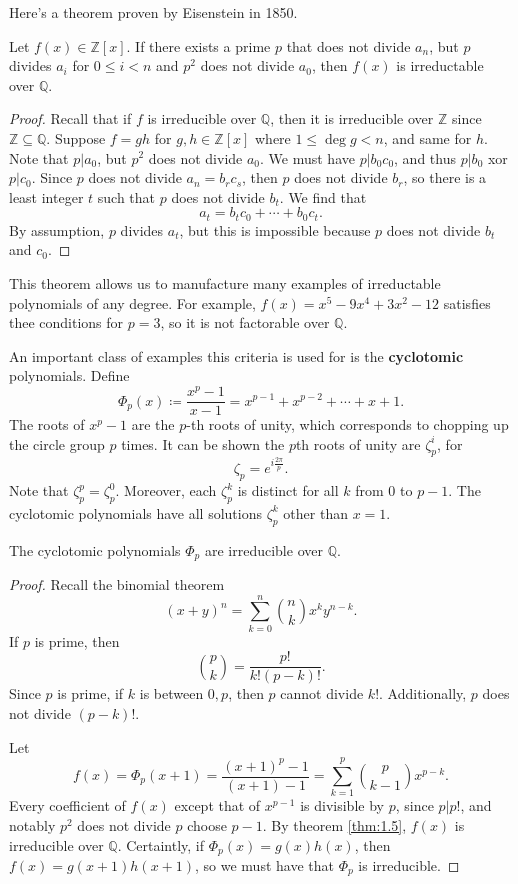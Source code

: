 Here's a theorem proven by Eisenstein in 1850.
\begin{theorem}\label{thm:1.5}
	Let $f(x)\in\mathbb{Z} [x]$. If there exists a prime $p$ that does not divide $a_n$, but $p$ divides $a_i$ for $0\leq i<n$ and $p^2$ does not divide $a_0$, then $f(x)$ is irreductable over $\mathbb{Q} $.
\end{theorem}
\begin{proof}
	Recall that if $f$ is irreducible over $\mathbb{Q} $, then it is irreducible over $\mathbb{Z} $ since $\mathbb{Z} \subseteq \mathbb{Q} $. Suppose $f=gh$ for $g,h\in \mathbb{Z} [x]$ where $1\leq \operatorname{deg} g<n$, and same for $h$. Note that $p|a_0$, but $p^2$ does not divide $a_0$. We must have $p|b_0c_0$, and thus $p|b_0$ xor $p|c_0$. Since $p$ does not divide $a_n=b_rc_s$, then $p$ does not divide $b_r$, so there is a least integer $t$ such that $p$ does not divide $b_t$. We find that
	\[
		a_t = b_tc_0+\cdots +b_0c_t
	.\]
	By assumption, $p$ divides $a_t$, but this is impossible because $p$ does not divide $b_t$ and $c_0$.
\end{proof}

This theorem allows us to manufacture many examples of irreductable polynomials of any degree. For example, $f(x)=x^5-9x^4+3x^2-12$ satisfies thee conditions for $p=3$, so it is not factorable over $\mathbb{Q} $.

An important class of examples this criteria is used for is the \textbf{cyclotomic} polynomials. Define
\[
	\Phi_p(x)\coloneqq \frac{x^p-1}{x-1} =x^{p-1} +x^{p-2} +\cdots +x+1
.\]
The roots of $x^p-1$ are the $p$-th roots of unity, which corresponds to chopping up the circle group $p$ times. It can be shown the $p$th roots of unity are $\zeta_p^i$, for
\[
	\zeta_p = e^{i \frac{2\pi }{p} } 
.\]
Note that $\zeta_p^p=\zeta_p^0$. Moreover, each $\zeta_p^k$ is distinct for all $k$ from $0$ to $p-1$. The cyclotomic polynomials have all solutions $\zeta_p^k$ other than $x=1$.

\begin{corollary}\label{cor:1.4}
	The cyclotomic polynomials $\Phi _p$ are irreducible over $\mathbb{Q} $.
\end{corollary}
\begin{proof}
	Recall the binomial theorem
	\[
		(x+y)^n=\sum_{k=0}^{n} \binom{n}{k} x^k y^{n-k} 
	.\]
	If $p$ is prime, then
	\[
		\binom{p}{k} =\frac{p!}{k!(p-k)!} 
	.\]
	Since $p$ is prime, if $k$ is between $0,p$, then $p$ cannot divide $k!$. Additionally, $p$ does not divide $(p-k)!$.

	Let
	\[
		f(x)=\Phi _p(x+1)=\frac{\left( x+1 \right)^p-1}{(x+1)-1} =\sum_{k=1}^{p} \binom{p}{k-1} x^{p-k} 
	.\]
	Every coefficient of $f(x)$ except that of $x^{p-1} $ is divisible by $p$, since $p|p!$, and notably $p^2$ does not divide $p$ choose $p-1$. By theorem \ref{thm:1.5}, $f(x)$ is irreducible over $\mathbb{Q} $. Certaintly, if $\Phi_p(x)=g(x)h(x)$, then $f(x)=g(x+1)h(x+1)$, so we must have that $\Phi _p$ is irreducible.
\end{proof}

